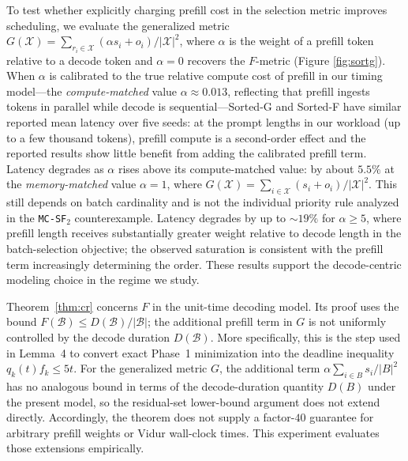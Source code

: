 \documentclass[nonblindrev]{informs3_hide}
\newcommand{\xhdr}[1]{\vspace{1mm} \noindent{\bf #1}}
\newcommand{\mcsdff}{\texttt{MC-SF$_2$}}
\begin{document}
\xhdr{Robustness to prefill weighting.} To test whether explicitly charging prefill cost in the selection metric improves scheduling, we evaluate the generalized metric $G(\mathcal{X})=\sum_{r_i\in\mathcal X}(\alpha s_i+o_i)/|\mathcal{X}|^2$, where $\alpha$ is the weight of a prefill token relative to a decode token and $\alpha=0$ recovers the $F$-metric (Figure \ref{fig:sortg}). When $\alpha$ is calibrated to the true relative compute cost of prefill in our timing model---the \emph{compute-matched} value $\alpha\approx 0.013$, reflecting that prefill ingests tokens in parallel while decode is sequential---Sorted-G and Sorted-F have similar reported mean latency over five seeds: at the prompt lengths in our workload (up to a few thousand tokens), prefill compute is a second-order effect and the reported results show little benefit from adding the calibrated prefill term. Latency degrades as $\alpha$ rises above its compute-matched value: by about $5.5\%$ at the \emph{memory-matched} value $\alpha=1$, where $G(\mathcal X)=\sum_{i\in\mathcal X}(s_i+o_i)/|\mathcal X|^2$. This still depends on batch cardinality and is not the individual priority rule analyzed in the \mcsdff{} counterexample. Latency degrades by up to $\sim 19\%$ for $\alpha\ge 5$, where prefill length receives substantially greater weight
relative to decode length in the batch-selection objective; the observed saturation is consistent with the prefill term increasingly determining the order. These results support the decode-centric modeling choice in the regime we study. 

Theorem~\ref{thm:cr} concerns $F$ in the unit-time decoding model. Its proof uses the bound $F(\mathcal B)\le D(\mathcal B)/|\mathcal B|$; the additional prefill term in $G$ is not uniformly controlled by the decode duration $D(\mathcal B)$. More specifically, this is the step used in Lemma~4 to convert exact Phase~1 minimization into the deadline inequality $q_k(t)f_k\le 5t$. For the generalized metric $G$, the additional term $\alpha\sum_{i\in B}s_i/|B|^2$ has no analogous bound in terms of the decode-duration quantity $D(B)$ under the present model, so the residual-set lower-bound argument does not extend directly. Accordingly, the theorem does not supply a factor-$40$ guarantee for arbitrary prefill weights or Vidur wall-clock times. This experiment evaluates those extensions empirically.
\end{document}
